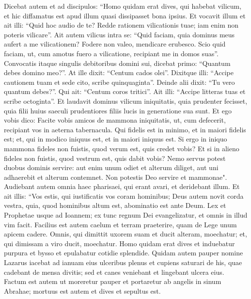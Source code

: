 \begin{biblechapter}  
\verse Dicebat autem et ad discipulos: “Homo quidam erat dives, qui habebat vilicum, et hic diffamatus est apud illum quasi dissipasset bona ipsius. 
\verse Et vocavit illum et ait illi: “Quid hoc audio de te? Redde rationem vilicationis tuae; iam enim non poteris vilicare”. 
\verse Ait autem vilicus intra se: “Quid faciam, quia dominus meus aufert a me vilicationem? Fodere non valeo, mendicare erubesco. 
\verse Scio quid faciam, ut, cum amotus fuero a vilicatione, recipiant me in domos suas”. 
\verse Convocatis itaque singulis debitoribus domini sui, dicebat primo: “Quantum debes domino meo?”. 
\verse At ille dixit: “Centum cados olei”. Dixitque illi: “Accipe cautionem tuam et sede cito, scribe quinquaginta”.  
\verse Deinde alii dixit: “Tu vero quantum debes?”. Qui ait: “Centum coros tritici”. Ait illi: “Accipe litteras tuas et scribe octoginta”. 
\verse Et laudavit dominus vilicum iniquitatis, quia prudenter fecisset, quia filii huius saeculi prudentiores filiis lucis in generatione sua sunt. 
\verse Et ego vobis dico: Facite vobis amicos de mammona iniquitatis, ut, cum defecerit, recipiant vos in aeterna tabernacula. 
\verse Qui fidelis est in minimo, et in maiori fidelis est; et, qui in modico iniquus est, et in maiori iniquus est. 
\verse Si ergo in iniquo mammona fideles non fuistis, quod verum est, quis credet vobis? 
\verse Et si in alieno fideles non fuistis, quod vestrum est, quis dabit vobis? 
\verse Nemo servus potest duobus dominis servire: aut enim unum odiet et alterum diliget, aut uni adhaerebit et alterum contemnet. Non potestis Deo servire et mammonae". 
\verse Audiebant autem omnia haec pharisaei, qui erant avari, et deridebant illum. 
\verse Et ait illis: “Vos estis, qui iustificatis vos coram hominibus; Deus autem novit corda vestra, quia, quod hominibus altum est, abominatio est ante Deum. 
\verse Lex et Prophetae usque ad Ioannem; ex tunc regnum Dei evangelizatur, et omnis in illud vim facit. 
\verse Facilius est autem caelum et terram praeterire, quam de Lege unum apicem cadere. 
\verse Omnis, qui dimittit uxorem suam et ducit alteram, moechatur; et, qui dimissam a viro ducit, moechatur. 
\verse Homo quidam erat dives et induebatur purpura et bysso et epulabatur cotidie splendide. 
\verse Quidam autem pauper nomine Lazarus iacebat ad ianuam eius ulceribus plenus 
\verse et cupiens saturari de his, quae cadebant de mensa divitis; sed et canes veniebant et lingebant ulcera eius. 
\verse Factum est autem ut moreretur pauper et portaretur ab angelis in sinum Abrahae; mortuus est autem et dives et sepultus est. 

\end{biblechapter}
